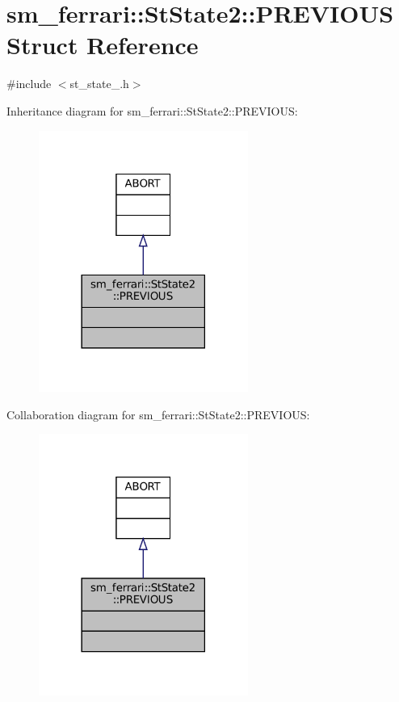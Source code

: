 \hypertarget{structsm__ferrari_1_1StState2_1_1PREVIOUS}{}\section{sm\+\_\+ferrari\+:\+:St\+State2\+:\+:P\+R\+E\+V\+I\+O\+US Struct Reference}
\label{structsm__ferrari_1_1StState2_1_1PREVIOUS}


{\ttfamily \#include $<$st\+\_\+state\+\_.\+h$>$}



Inheritance diagram for sm\+\_\+ferrari\+:\+:St\+State2\+:\+:P\+R\+E\+V\+I\+O\+US\+:
\nopagebreak
\begin{figure}[H]
\begin{center}
\leavevmode
\includegraphics[width=194pt]{structsm__ferrari_1_1StState2_1_1PREVIOUS__inherit__graph}
\end{center}
\end{figure}


Collaboration diagram for sm\+\_\+ferrari\+:\+:St\+State2\+:\+:P\+R\+E\+V\+I\+O\+US\+:
\nopagebreak
\begin{figure}[H]
\begin{center}
\leavevmode
\includegraphics[width=194pt]{structsm__ferrari_1_1StState2_1_1PREVIOUS__coll__graph}
\end{center}
\end{figure}


